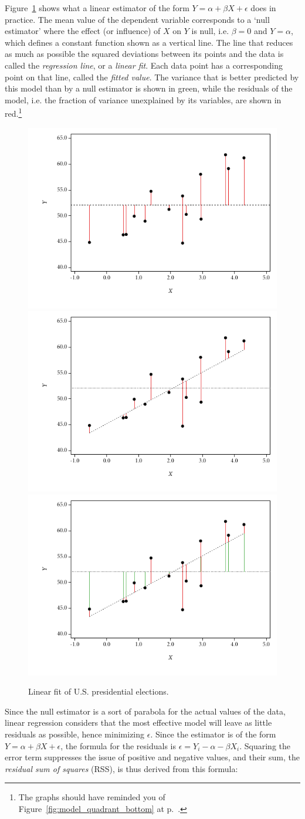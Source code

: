   Figure~\ref{fig:hibbs_fit} shows what a linear estimator of the form $Y = \alpha + \beta X + \epsilon$ does in practice. The mean value of the dependent variable corresponds to a `null estimator' where the effect (or influence) of $X$ on $Y$ is null, i.e. $\beta = 0$ and $Y = \alpha$, which defines a constant function shown as a vertical line. The line that reduces as much as possible the squared deviations between its points and the data is called the \emph{regression line}, or a \emph{linear fit}. Each data point has a corresponding point on that line, called the \emph{fitted value}. The variance that is better predicted by this model than by a null estimator is shown in green, while the residuals of the model, i.e. the fraction of variance unexplained by its variables, are shown in red.\footnote{The graphs should have reminded you of Figure~\ref{fig:model_quadrant_bottom} at p.~\pageref{fig:model_quadrant_bottom}.}

  \begin{figure}[htp]
  	\centering
  	\includegraphics[width=.32\textwidth]{images/hibbs2a.pdf}
  	\includegraphics[width=.32\textwidth]{images/hibbs2b.pdf}
  	\includegraphics[width=.32\textwidth]{images/hibbs2c.pdf}

  	\caption[Linear fit of U.S. presidential elections]{\label{fig:hibbs_fit}%
  	Linear fit of U.S. presidential elections. %
  	\hibbs}
  \end{figure}%

  Since the null estimator is a sort of parabola for the actual values of the data, linear regression considers that the most effective model will leave as little residuals as possible, hence minimizing $\epsilon$. Since the estimator is of the form $Y = \alpha + \beta X + \epsilon$, the formula for the residuals is $\epsilon = Y_i - \alpha - \beta X_i$. Squaring the error term suppresses the issue of positive and negative values, and their sum, the \emph{residual sum of squares} (RSS), is thus derived from this formula:

